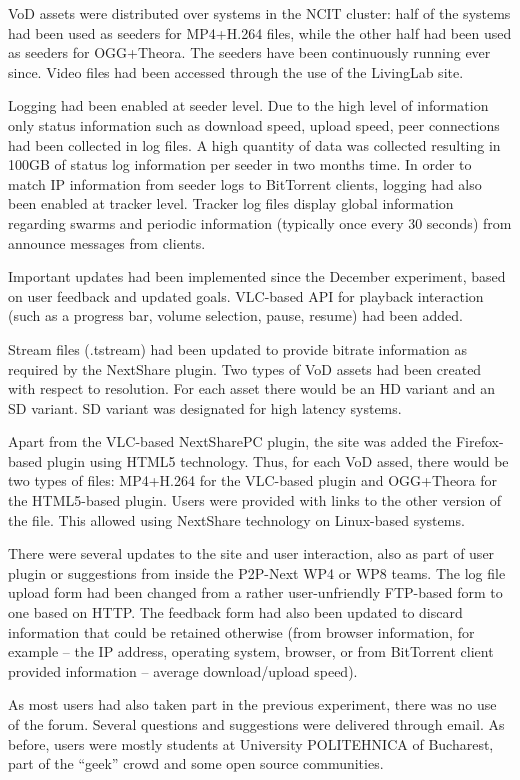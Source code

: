 VoD assets were distributed over systems in the NCIT cluster: half of the
systems had been used as seeders for MP4+H.264 files, while the other half had
been used as seeders for OGG+Theora. The seeders have been continuously
running ever since. Video files had been accessed through the use of the
LivingLab site.

Logging had been enabled at seeder level. Due to the high level of information
only status information such as download speed, upload speed, peer connections
had been collected in log files. A high quantity of data was collected
resulting in 100GB of status log information per seeder in two months time. In
order to match IP information from seeder logs to BitTorrent clients, logging
had also been enabled at tracker level. Tracker log files display global
information regarding swarms and periodic information (typically once every 30
seconds) from announce messages from clients.

Important updates had been implemented since the December experiment, based on
user feedback and updated goals. VLC-based API for playback interaction (such
as a progress bar, volume selection, pause, resume) had been added.

Stream files (.tstream) had been updated to provide bitrate information as
required by the NextShare plugin. Two types of VoD assets had been created
with respect to resolution. For each asset there would be an HD variant and an
SD variant. SD variant was designated for high latency systems.

Apart from the VLC-based NextSharePC plugin, the site was added the
Firefox-based plugin using HTML5 technology. Thus, for each VoD assed, there
would be two types of files: MP4+H.264 for the VLC-based plugin and OGG+Theora
for the HTML5-based plugin. Users were provided with links to the other
version of the file. This allowed using NextShare technology on Linux-based
systems.

There were several updates to the site and user interaction, also as part of
user plugin or suggestions from inside the P2P-Next WP4 or WP8 teams. The log
file upload form had been changed from a rather user-unfriendly FTP-based form
to one based on HTTP. The feedback form had also been updated to discard
information that could be retained otherwise (from browser information, for
example – the IP address, operating system, browser, or from BitTorrent client
provided information – average download/upload speed).

As most users had also taken part in the previous experiment, there was no use
of the forum. Several questions and suggestions were delivered through email.
As before, users were mostly students at University POLITEHNICA of Bucharest,
part of the ``geek'' crowd and some open source communities.

